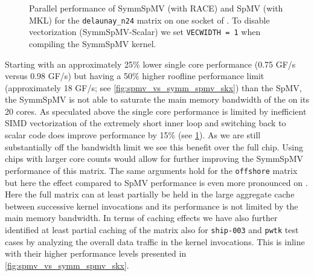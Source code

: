   \begin{figure}[tbp]
  	\centering
  	\caption{Parallel performance  of \acrshort{SymmSpMV} (with \acrshort{RACE})  and \acrshort{SpMV} (with \acrshort{MKL}) for the \texttt{delaunay\_n24} matrix on one socket of \SKX. To disable vectorization (SymmSpMV-Scalar) we set \texttt{VECWIDTH = 1} when compiling the \acrshort{SymmSpMV} kernel.}
  	\label{fig:scaling_delaunay}
  \end{figure}
%
Starting with an approximately 25\% lower single core performance (0.75 GF/s versus 0.98 GF/s) but having a 50\% higher roofline performance limit (approximately 18 GF/s; see \cref{fig:spmv_vs_symm_spmv_skx}) than the \acrshort{SpMV}, the \acrshort{SymmSpMV} is not able to saturate the main memory bandwidth of the \SKX on its 20 cores. As speculated above the single core performance is limited by inefficient SIMD vectorization of the extremely short inner loop and switching back to scalar code does improve performance by 15\% (see \cref{fig:scaling_delaunay}). As we are still substantially off the bandwidth limit we see this benefit over the full chip. Using chips with larger core counts would allow for further improving the \acrshort{SymmSpMV} performance of this matrix. The same arguments hold for the \texttt{offshore} matrix but here the effect compared to \acrshort{SpMV} performance is even more pronounced on \SKX.  Here the full matrix can at least partially be held in the large aggregate cache between successive kernel invocations and its performance is not limited by the main memory bandwidth. In terms of caching effects we have also further identified at least partial caching of the matrix also for \texttt{ship-003} and \texttt{pwtk} test cases by analyzing the overall data traffic in the kernel invocations. This is inline with their higher performance levels presented in \cref{fig:spmv_vs_symm_spmv_skx}. 

